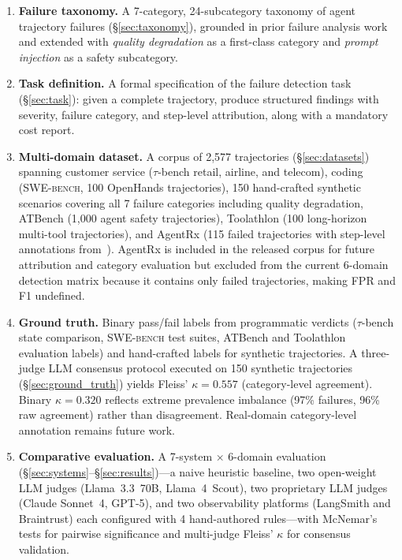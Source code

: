 \documentclass[11pt]{article}
\newcommand{\taubench}{$\tau$-bench\xspace}
\newcommand{\swebench}{\textsc{SWE-bench}\xspace}
\begin{document}
\begin{enumerate}[leftmargin=2em]
  \item \textbf{Failure taxonomy.} A 7-category, 24-subcategory taxonomy of
    agent trajectory failures (\S\ref{sec:taxonomy}), grounded in prior
    failure analysis work~\citep{cemri2025mast, winston2025taxonomy,
    microsoft2025taxonomy} and extended with \emph{quality degradation} as a
    first-class category and \emph{prompt injection} as a safety subcategory.

  \item \textbf{Task definition.} A formal specification of the failure
    detection task (\S\ref{sec:task}): given a complete trajectory, produce
    structured findings with severity, failure category, and step-level
    attribution, along with a mandatory cost report.

  \item \textbf{Multi-domain dataset.} A corpus of {2,577}
    trajectories (\S\ref{sec:datasets}) spanning customer service
    (\taubench retail, airline, and telecom), coding (\swebench, 100
    OpenHands trajectories), 150 hand-crafted synthetic scenarios covering
    all 7 failure categories including quality degradation, ATBench (1,000
    agent safety trajectories), Toolathlon (100 long-horizon multi-tool
    trajectories), and AgentRx (115 failed trajectories with step-level
    annotations from~\citet{agentrx2026}). AgentRx is included in the
    released corpus for future attribution and category evaluation but
    excluded from the current 6-domain detection matrix because it
    contains only failed trajectories, making FPR and F1 undefined.

  \item \textbf{Ground truth.} Binary pass/fail labels from programmatic
    verdicts (\taubench state comparison, \swebench test suites, ATBench and
    Toolathlon evaluation labels) and hand-crafted labels for synthetic
    trajectories. A three-judge LLM consensus protocol executed on
    150 synthetic trajectories (\S\ref{sec:ground_truth}) yields
    Fleiss' $\kappa = 0.557$ (category-level agreement). Binary
    $\kappa = 0.320$ reflects extreme prevalence imbalance (97\% failures,
    96\% raw agreement) rather than disagreement.
    Real-domain category-level annotation remains future work.

  \item \textbf{Comparative evaluation.} A 7-system $\times$
    6-domain evaluation (\S\ref{sec:systems}--\S\ref{sec:results})---a naive
    heuristic baseline, two open-weight LLM judges (Llama~3.3~70B,
    Llama~4~Scout), two proprietary LLM judges (Claude Sonnet~4, GPT-5),
    and two observability platforms (LangSmith and Braintrust) each
    configured with 4 hand-authored rules---with McNemar's tests for
    pairwise significance and multi-judge Fleiss' $\kappa$ for consensus
    validation.


\end{enumerate}
\end{document}

